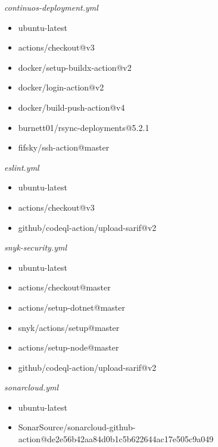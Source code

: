 \textit{continuos-deployment.yml}
\begin{itemize}
    \item ubuntu-latest
    \item actions/checkout@v3
    \item docker/setup-buildx-action@v2
    \item docker/login-action@v2
    \item docker/build-push-action@v4
    \item burnett01/rsync-deployments@5.2.1
    \item fifsky/ssh-action@master
\end{itemize}

\textit{eslint.yml}
\begin{itemize}
    \item ubuntu-latest
    \item actions/checkout@v3
    \item github/codeql-action/upload-sarif@v2
\end{itemize}

\textit{snyk-security.yml}
\begin{itemize}
    \item ubuntu-latest
    \item actions/checkout@master
    \item actions/setup-dotnet@master
    \item snyk/actions/setup@master
    \item actions/setup-node@master
    \item github/codeql-action/upload-sarif@v2 
\end{itemize}

\textit{sonarcloud.yml}
\begin{itemize}
    \item ubuntu-latest
    \item SonarSource/sonarcloud-github-action@de2e56b42aa84d0b1c5b622644ac17e505c9a049 
\end{itemize}

